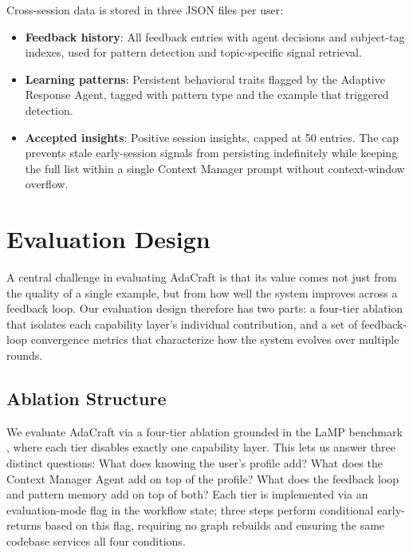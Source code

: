 \documentclass[conference]{IEEEtran}
\begin{document}
Cross-session data is stored in three JSON files per user:
\begin{itemize}
    \item \textbf{Feedback history}: All feedback entries with agent decisions and subject-tag indexes, used for pattern detection and topic-specific signal retrieval.
    \item \textbf{Learning patterns}: Persistent behavioral traits flagged by the Adaptive Response Agent, tagged with pattern type and the example that triggered detection.
    \item \textbf{Accepted insights}: Positive session insights, capped at 50 entries. The cap prevents stale early-session signals from persisting indefinitely while keeping the full list within a single Context Manager prompt without context-window overflow.
\end{itemize}

\section{Evaluation Design}
\label{sec:evaluation}

A central challenge in evaluating AdaCraft is that its value comes not just from the quality of a single example, but from how well the system improves across a feedback loop. Our evaluation design therefore has two parts: a four-tier ablation that isolates each capability layer's individual contribution, and a set of feedback-loop convergence metrics that characterize how the system evolves over multiple rounds.

\subsection{Ablation Structure}

We evaluate AdaCraft via a four-tier ablation grounded in the LaMP benchmark \cite{b3}, where each tier disables exactly one capability layer. This lets us answer three distinct questions: What does knowing the user's profile add? What does the Context Manager Agent add on top of the profile? What does the feedback loop and pattern memory add on top of both? Each tier is implemented via an evaluation-mode flag in the workflow state; three steps perform conditional early-returns based on this flag, requiring no graph rebuilds and ensuring the same codebase services all four conditions.
\end{document}
